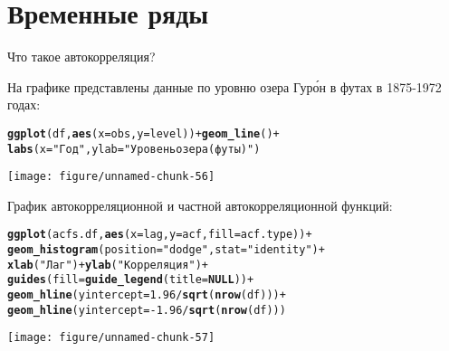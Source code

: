 \documentclass[pdftex,11pt,openany]{book}\usepackage[]{graphicx}\usepackage[]{color}
\makeatletter
\newcommand{\hlnum}[1]{\textcolor[rgb]{0.686,0.059,0.569}{#1}}%
\newcommand{\hlstr}[1]{\textcolor[rgb]{0.192,0.494,0.8}{#1}}%
\newcommand{\hlopt}[1]{\textcolor[rgb]{0,0,0}{#1}}%
\newcommand{\hlstd}[1]{\textcolor[rgb]{0.345,0.345,0.345}{#1}}%
\newcommand{\hlkwa}[1]{\textcolor[rgb]{0.161,0.373,0.58}{\textbf{#1}}}%
\newcommand{\hlkwc}[1]{\textcolor[rgb]{0.333,0.667,0.333}{#1}}%
\newcommand{\hlkwd}[1]{\textcolor[rgb]{0.737,0.353,0.396}{\textbf{#1}}}%
\newenvironment{kframe}{%
 \def\at@end@of@kframe{}%
 \ifinner\ifhmode%
  \def\at@end@of@kframe{\end{minipage}}%
  \begin{minipage}{\columnwidth}%
 \fi\fi%
 \def\FrameCommand##1{\hskip\@totalleftmargin \hskip-\fboxsep
 \colorbox{shadecolor}{##1}\hskip-\fboxsep
     \hskip-\linewidth \hskip-\@totalleftmargin \hskip\columnwidth}%
 \MakeFramed {\advance\hsize-\width
   \@totalleftmargin\z@ \linewidth\hsize
   \@setminipage}}%
 {\par\unskip\endMakeFramed%
 \at@end@of@kframe}
\newenvironment{knitrout}{}{} %
\makeatother
\begin{document}
\begin{solution}
\end{solution}






\chapter{Временные ряды}


\begin{problem}
Что такое автокорреляция?
\end{problem}

\begin{solution}
\end{solution}


\begin{problem}
На графике представлены данные по уровню озера Гур\'{о}н в футах в 1875-1972 годах:  




\begin{knitrout}
\color{fgcolor}\begin{kframe}
\begin{alltt}
\hlkwd{ggplot}\hlstd{(df,}\hlkwd{aes}\hlstd{(}\hlkwc{x}\hlstd{=obs,}\hlkwc{y}\hlstd{=level))}\hlopt{+}\hlkwd{geom_line}\hlstd{()}\hlopt{+}
    \hlkwd{labs}\hlstd{(}\hlkwc{x}\hlstd{=}\hlstr{"Год"}\hlstd{,}\hlkwc{ylab}\hlstd{=}\hlstr{"Уровень озера (футы)"}\hlstd{)}
\end{alltt}
\end{kframe}
\texttt{[image: figure/unnamed-chunk-56]} 

\end{knitrout}


График автокорреляционной и частной автокорреляционной функций:

\begin{knitrout}
\color{fgcolor}\begin{kframe}
\begin{alltt}
\hlkwd{ggplot}\hlstd{(acfs.df,}\hlkwd{aes}\hlstd{(}\hlkwc{x}\hlstd{=lag,}\hlkwc{y}\hlstd{=acf,}\hlkwc{fill}\hlstd{=acf.type))}\hlopt{+}
    \hlkwd{geom_histogram}\hlstd{(}\hlkwc{position}\hlstd{=}\hlstr{"dodge"}\hlstd{,}\hlkwc{stat}\hlstd{=}\hlstr{"identity"}\hlstd{)}\hlopt{+}
  \hlkwd{xlab}\hlstd{(}\hlstr{"Лаг"}\hlstd{)}\hlopt{+}\hlkwd{ylab}\hlstd{(}\hlstr{"Корреляция"}\hlstd{)} \hlopt{+}
  \hlkwd{guides}\hlstd{(}\hlkwc{fill}\hlstd{=}\hlkwd{guide_legend}\hlstd{(}\hlkwc{title}\hlstd{=}\hlkwa{NULL}\hlstd{))}\hlopt{+}
  \hlkwd{geom_hline}\hlstd{(}\hlkwc{yintercept}\hlstd{=}\hlnum{1.96}\hlopt{/}\hlkwd{sqrt}\hlstd{(}\hlkwd{nrow}\hlstd{(df)))}\hlopt{+}
  \hlkwd{geom_hline}\hlstd{(}\hlkwc{yintercept}\hlstd{=}\hlopt{-}\hlnum{1.96}\hlopt{/}\hlkwd{sqrt}\hlstd{(}\hlkwd{nrow}\hlstd{(df)))}
\end{alltt}
\end{kframe}
\texttt{[image: figure/unnamed-chunk-57]} 


\end{knitrout}
\end{problem}
\end{document}
